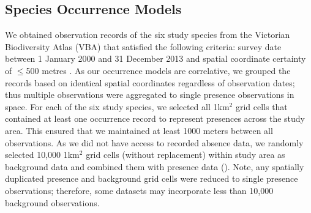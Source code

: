 \subsection{Species Occurrence Models}

We obtained observation records of the six study species from the Victorian Biodiversity Atlas (VBA) that satisfied the following criteria: survey date between 1 January 2000 and 31 December 2013 and spatial coordinate certainty of $\leq$500 metres \citep{depi16}.  As our occurrence models are correlative, we grouped the records based on identical spatial coordinates regardless of observation dates; thus multiple observations were aggregated to single presence observations in space. For each of the six study species, we selected all 1km$^2$ grid cells that contained at least one occurrence record to represent presences across the study area. This ensured that we maintained at least 1000 meters between all observations. As we did not have access to recorded absence data, we randomly selected 10,000 1km$^2$ grid cells (without replacement) within study area as background data and combined them with presence data (). Note, any spatially duplicated presence and background grid cells were reduced to single presence observations; therefore, some datasets may incorporate less than 10,000 background observations.

